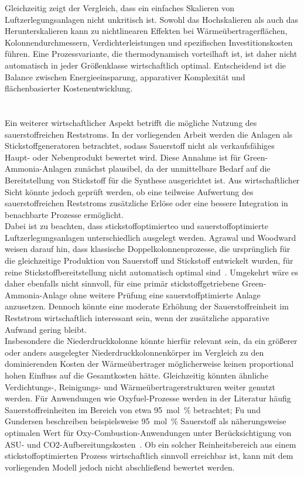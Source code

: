 Gleichzeitig zeigt der Vergleich, dass ein einfaches Skalieren von Luftzerlegungsanlagen nicht unkritisch ist. Sowohl das Hochskalieren als auch das Herunterskalieren kann zu nichtlinearen Effekten bei Wärmeübertragerflächen, Kolonnendurchmessern, Verdichterleistungen und spezifischen Investitionskosten führen. Eine Prozessvariante, die thermodynamisch vorteilhaft ist, ist daher nicht automatisch in jeder Größenklasse wirtschaftlich optimal. Entscheidend ist die Balance zwischen Energieeinsparung, apparativer Komplexität und flächenbasierter Kostenentwicklung.\\
\\
\\
Ein weiterer wirtschaftlicher Aspekt betrifft die mögliche Nutzung des sauerstoffreichen Reststroms. In der vorliegenden Arbeit werden die Anlagen als Stickstoffgeneratoren betrachtet, sodass Sauerstoff nicht als verkaufsfähiges Haupt- oder Nebenprodukt bewertet wird. Diese Annahme ist für Green-Ammonia-Anlagen zunächst plausibel, da der unmittelbare Bedarf auf die Bereitstellung von Stickstoff für die Synthese ausgerichtet ist. Aus wirtschaftlicher Sicht könnte jedoch geprüft werden, ob eine teilweise Aufwertung des sauerstoffreichen Reststroms zusätzliche Erlöse oder eine bessere Integration in benachbarte Prozesse ermöglicht.\\
Dabei ist zu beachten, dass stickstoffoptimierteo und sauerstoffoptimierte Luftzerlegungsanlagen unterschiedlich ausgelegt werden. Agrawal und Woodward weisen darauf hin, dass klassische Doppelkolonnenprozesse, die ursprünglich für die gleichzeitige Produktion von Sauerstoff und Stickstoff entwickelt wurden, für reine Stickstoffbereitstellung nicht automatisch optimal sind~\cite{agrawalEfficientCryogenicNitrogen1991}. Umgekehrt wäre es daher ebenfalls nicht sinnvoll, für eine primär stickstoffgetriebene Green-Ammonia-Anlage ohne weitere Prüfung eine sauerstoffptimierte Anlage anzusetzen. Dennoch könnte eine moderate Erhöhung der Sauerstoffreinheit im Reststrom wirtschaftlich interessant sein, wenn der zusätzliche apparative Aufwand gering bleibt.\\
Insbesondere die Niederdruckkolonne könnte hierfür relevant sein, da ein größerer oder anders ausgelegter Niederdruckkolonnenkörper im Vergleich zu den dominierenden Kosten der Wärmeübertrager möglicherweise keinen proportional hohen Einfluss auf die Gesamtkosten hätte. Gleichzeitig könnten ähnliche Verdichtungs-, Reinigungs- und Wärmeübertragerstrukturen weiter genutzt werden. Für Anwendungen wie Oxyfuel-Prozesse werden in der Literatur häufig Sauerstoffreinheiten im Bereich von etwa \SI{95}{mol\percent} betrachtet; Fu und Gundersen beschreiben beispielsweise \SI{95}{mol\percent} Sauerstoff als näherungsweise optimalen Wert für Oxy-Combustion-Anwendungen unter Berücksichtigung von ASU- und CO2-Aufbereitungskosten~\cite{fuUsingExergyAnalysis2012}. Ob ein solcher Reinheitsbereich aus einem stickstoffoptimierten Prozess wirtschaftlich sinnvoll erreichbar ist, kann mit dem vorliegenden Modell jedoch nicht abschließend bewertet werden. \\
